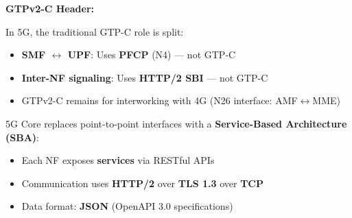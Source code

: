 
\textbf{GTPv2-C Header:}



In 5G, the traditional GTP-C role is split:

\begin{itemize}
\tightlist
\item
  \textbf{SMF \ensuremath{\leftrightarrow} UPF}: Uses \textbf{PFCP} (N4) — not GTP-C
\item
  \textbf{Inter-NF signaling}: Uses \textbf{HTTP/\allowbreak{}2 SBI} — not GTP-C
\item
  GTPv2-C remains for interworking with 4G (N26 interface: AMF\ensuremath{\leftrightarrow}MME)
\end{itemize}



\CNchained{}

5G Core replaces point-to-point interfaces with a \textbf{Service-Based Architecture (SBA)}:

\begin{itemize}
\tightlist
\item
  Each NF exposes \textbf{services} via RESTful APIs
\item
  Communication uses \textbf{HTTP/\allowbreak{}2} over \textbf{TLS 1.3} over \textbf{TCP}
\item
  Data format: \textbf{JSON} (OpenAPI 3.0 specifications)
\end{itemize}



